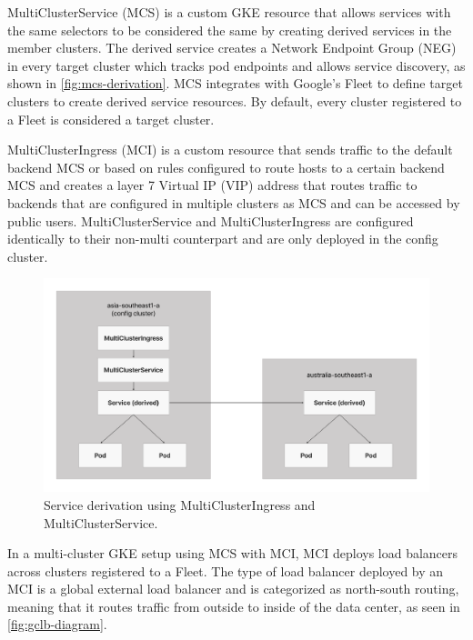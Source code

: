 MultiClusterService (MCS) is a custom GKE resource that allows services with the same selectors to be considered the same by creating derived services in the member clusters. The derived service creates a Network Endpoint Group (NEG) in every target cluster which tracks pod endpoints and allows service discovery, as shown in \autoref{fig:mcs-derivation}. MCS integrates with Google's Fleet to define target clusters to create derived service resources. By default, every cluster registered to a Fleet is considered a target cluster.

MultiClusterIngress (MCI) is a custom resource that sends traffic to the default backend MCS or based on rules configured to route hosts to a certain backend MCS and creates a layer 7 Virtual IP (VIP) address that routes traffic to backends that are configured in multiple clusters as MCS and can be accessed by public users. MultiClusterService and MultiClusterIngress are configured identically to their non-multi counterpart and are only deployed in the config cluster.

\begin{figure}
	\centering
	\includegraphics[width=1\textwidth]{assets/diagrams/mcs-mci.png}
	\caption{Service derivation using MultiClusterIngress and MultiClusterService.}
	\label{fig:mcs-derivation}
\end{figure}

In a multi-cluster GKE setup using MCS with MCI, MCI deploys load balancers across clusters registered to a Fleet. The type of load balancer deployed by an MCI is a global external load balancer and is categorized as north-south routing, meaning that it routes traffic from outside to inside of the data center, as seen in \autoref{fig:gclb-diagram}.

